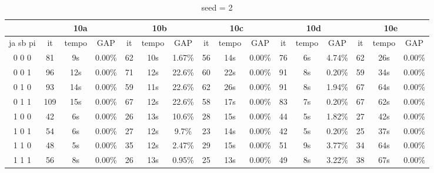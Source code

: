 \documentclass[12pt]{article}
\begin{document}
\begin{table}[!htb]
\centering
\footnotesize
\begin{tabular}{|c||c|c|c||c|c|c||c|c|c||c|c|c||c|c|c|}
\cline{2-16}
\multicolumn{1}{c||}{} & \multicolumn{3}{c||}{10a} & \multicolumn{3}{c||}{10b} & \multicolumn{3}{c||}{10c} & \multicolumn{3}{c||}{10d} & \multicolumn{3}{c|}{10e}\\
\hline
ja sb pi & it & tempo & GAP & it & tempo & GAP & it & tempo & GAP & it & tempo & GAP & it & tempo & GAP \\
\hline
0 0 0 & 81 & 9s & 0.00\% & 62 & 10s & 1.67\% & 56 & 14s & 0.00\% & 76 & 6s & 4.74\% & 62 & 26s & 0.00\% \\
0 0 1 & 96 & 12s & 0.00\% & 71 & 12s & 22.6\% & 60 & 22s & 0.00\% & 91 & 8s & 0.20\% & 59 & 34s & 0.00\% \\
0 1 0 & 93 & 14s & 0.00\% & 59 & 11s & 22.6\% & 62 & 26s & 0.00\% & 91 & 8s & 1.94\% & 67 & 64s & 0.00\% \\
0 1 1 & 109 & 15s & 0.00\% & 67 & 12s & 22.6\% & 58 & 17s & 0.00\% & 83 & 7s & 0.20\% & 67 & 62s & 0.00\% \\
1 0 0 & 42 & 6s & 0.00\% & 26 & 13s & 10.6\% & 28 & 15s & 0.00\% & 44 & 5s & 1.82\% & 27 & 42s & 0.00\% \\
1 0 1 & 54 & 6s & 0.00\% & 27 & 12s & 9.7\% & 23 & 14s & 0.00\% & 42 & 5s & 0.20\% & 25 & 37s & 0.00\% \\
1 1 0 & 48 & 5s & 0.00\% & 35 & 12s & 2.47\% & 29 & 15s & 0.00\% & 51 & 9s & 3.77\% & 34 & 64s & 0.00\% \\
1 1 1 & 56 & 8s & 0.00\% & 26 & 13s & 0.95\% & 25 & 13s & 0.00\% & 49 & 8s & 3.22\% & 38 & 67s &  0.00\%\\
\hline
\end{tabular}
\caption{seed = 2}
\end{table}
\end{document}
